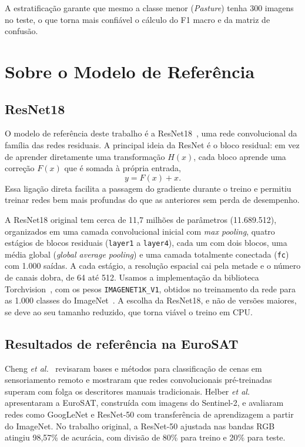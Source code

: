 \documentclass[conference,a4paper]{IEEEtran}
\begin{document}
A estratificação garante que mesmo a classe menor (\textit{Pasture}) tenha 300 imagens no teste, o que torna mais confiável o cálculo do F1 macro e da matriz de confusão.

\section{Sobre o Modelo de Referência}
\label{sec:referencia}

\subsection{ResNet18}

O modelo de referência deste trabalho é a ResNet18~\cite{he2016deep}, uma rede convolucional da família das redes residuais. A principal ideia da ResNet é o bloco residual: em vez de aprender diretamente uma transformação $H(x)$, cada bloco aprende uma correção $F(x)$ que é somada à própria entrada,
\begin{equation}
y = F(x) + x .
\end{equation}
Essa ligação direta facilita a passagem do gradiente durante o treino e permitiu treinar redes bem mais profundas do que as anteriores sem perda de desempenho.

A ResNet18 original tem cerca de 11,7 milhões de parâmetros (11.689.512), organizados em uma camada convolucional inicial com \textit{max pooling}, quatro estágios de blocos residuais (\texttt{layer1} a \texttt{layer4}), cada um com dois blocos, uma média global (\textit{global average pooling}) e uma camada totalmente conectada (\texttt{fc}) com 1.000 saídas. A cada estágio, a resolução espacial cai pela metade e o número de canais dobra, de 64 até 512. Usamos a implementação da biblioteca Torchvision~\cite{torchvision2016}, com os pesos \texttt{IMAGENET1K\_V1}, obtidos no treinamento da rede para as 1.000 classes do ImageNet~\cite{deng2009imagenet}. A escolha da ResNet18, e não de versões maiores, se deve ao seu tamanho reduzido, que torna viável o treino em CPU.

\subsection{Resultados de referência na EuroSAT}

Cheng \textit{et al.}~\cite{cheng2017remote} revisaram bases e métodos para classificação de cenas em sensoriamento remoto e mostraram que redes convolucionais pré-treinadas superam com folga os descritores manuais tradicionais. Helber \textit{et al.}~\cite{helber2018introducing,helber2019eurosat} apresentaram a EuroSAT, construída com imagens do Sentinel-2, e avaliaram redes como GoogLeNet e ResNet-50 com transferência de aprendizagem a partir do ImageNet. No trabalho original, a ResNet-50 ajustada nas bandas RGB atingiu 98,57\% de acurácia, com divisão de 80\% para treino e 20\% para teste.
\end{document}

